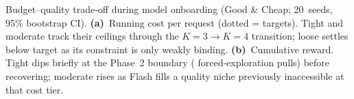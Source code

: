 Budget--quality trade-off during model onboarding (Good \& Cheap; 20~seeds, 95\% bootstrap CI).
\textbf{(a)}~Running cost per request (dotted = targets). Tight and moderate track their ceilings through the $K{=}3 \to K{=}4$ transition; loose settles below target as its constraint is only weakly binding.
\textbf{(b)}~Cumulative reward. Tight dips briefly at the Phase~2 boundary (\moBurninPulls{} forced-exploration pulls) before recovering; moderate rises as Flash fills a quality niche previously inaccessible at that cost tier.
